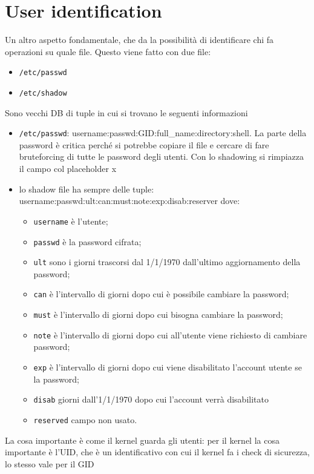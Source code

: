 \documentclass[12pt, oneside]{extbook} %
\begin{document}
\section{User identification}
Un altro aspetto fondamentale, che da la possibilità di identificare chi fa operazioni su quale file. Questo viene fatto con due file:
\begin{itemize}
\item \texttt{/etc/passwd}
\item \texttt{/etc/shadow}
\end{itemize}
Sono vecchi DB di tuple in cui si trovano le seguenti informazioni
\begin{itemize}
\item \texttt{/etc/passwd}: username:passwd:GID:full\_name:directory:shell. La parte della password è critica perché si potrebbe copiare il file e cercare di fare bruteforcing di tutte le password degli utenti. Con lo shadowing si rimpiazza il campo col placeholder x
\item lo shadow file ha sempre delle tuple: username:passwd:ult:can:must:note:exp:disab:reserver dove:
\begin{itemize}
	\item \texttt{username} è l'utente;
	\item \texttt{passwd} è la password cifrata;
	\item \texttt{ult} sono i giorni trascorsi dal 1/1/1970 dall'ultimo aggiornamento della password;
	\item \texttt{can} è l'intervallo di giorni dopo cui è possibile cambiare la password;
	\item \texttt{must} è l'intervallo di giorni dopo cui bisogna cambiare la password;
	\item \texttt{note} è l'intervallo di giorni dopo cui all'utente viene richiesto di cambiare password;
	\item \texttt{exp} è l'intervallo di giorni dopo cui viene disabilitato l'account utente se la password;
	\item \texttt{disab} giorni dall'1/1/1970 dopo cui l'account verrà disabilitato
	\item \texttt{reserved} campo non usato.
\end{itemize}
\end{itemize}
La cosa importante è come il kernel guarda gli utenti: per il kernel la cosa importante è l'UID, che è un identificativo con cui il kernel fa i check di sicurezza, lo stesso vale per il GID
\end{document}
